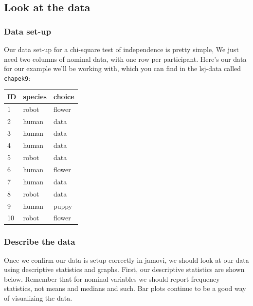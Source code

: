 \documentclass[
]{book}
\begin{document}
\hypertarget{look-at-the-data-4}{%
\subsection{Look at the data}\label{look-at-the-data-4}}

\hypertarget{data-set-up-4}{%
\subsubsection{Data set-up}\label{data-set-up-4}}

Our data set-up for a chi-square test of independence is pretty simple, We just need two columns of nominal data, with one row per participant. Here's our data for our example we'll be working with, which you can find in the lsj-data called \texttt{chapek9}:

\begin{longtable}[]{@{}lll@{}}
\toprule
ID & species & choice \\
\midrule
\endhead
1 & robot & flower \\
2 & human & data \\
3 & human & data \\
4 & human & data \\
5 & robot & data \\
6 & human & flower \\
7 & human & data \\
8 & robot & data \\
9 & human & puppy \\
10 & robot & flower \\
\bottomrule
\end{longtable}

\hypertarget{describe-the-data-3}{%
\subsubsection{Describe the data}\label{describe-the-data-3}}

Once we confirm our data is setup correctly in jamovi, we should look at our data using descriptive statistics and graphs. First, our descriptive statistics are shown below. Remember that for nominal variables we should report frequency statistics, not means and medians and such. Bar plots continue to be a good way of visualizing the data.
\end{document}
